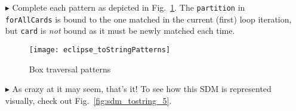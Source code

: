 \begin{itemize}
\clearpage

\item[$\blacktriangleright$] Complete each pattern as depicted in Fig.~\ref{fig:toStringPatterns}. The \texttt{partition} in \texttt{forAllCards} is bound to
the one matched in the current (first) loop iteration, but \texttt{card} is \emph{not} bound as it must be newly matched each time.

\vspace{0.5cm}

\begin{figure}[htp]
\begin{center}
  \texttt{[image: eclipse\_toStringPatterns]}
  \caption{Box traversal patterns}
  \label{fig:toStringPatterns}
\end{center}
\end{figure}

\vspace{0.5cm}

\item[$\blacktriangleright$] As crazy at it may seem, that's it!  To see how this SDM is represented visually, check out Fig.~\ref{fig:sdm_tostring_5}.

\end{itemize}
